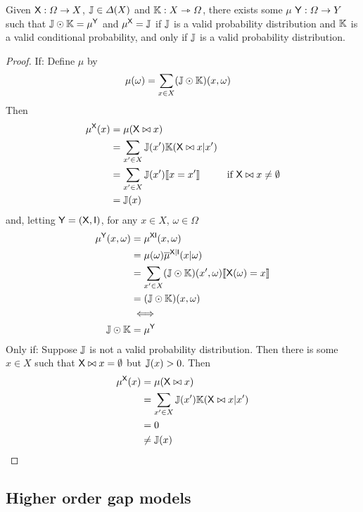 \begin{theorem}[Completion]\label{th:completion}
Given $\mathsf{X}:\Omega\to X$, $\mathbb{J}\in \Delta(X)$ and $\mathbb{K}:X\rightarrowtriangle \Omega$, there exists some $\mu$ $\mathsf{Y}:\Omega\to Y$ such that $\mathbb{J}\odot \mathbb{K}=\mu^{\mathsf{Y}}$ and $\mu^{\mathsf{X}}=\mathbb{J}$ if $\mathbb{J}$ is a valid probability distribution and $\mathbb{K}$ is a valid conditional probability, and only if $\mathbb{J}$ is a valid probability distribution.
\end{theorem}

\begin{proof}
If:
Define $\mu$ by
\begin{align}
	\mu(\omega) &= \sum_{x\in X} (\mathbb{J}\odot \mathbb{K})(x,\omega)
\end{align}
Then
\begin{align}
	\mu^{\mathsf{X}}(x) &= \mu (\mathsf{X}\bowtie x)\\
	&= \sum_{x'\in X} \mathbb{J}(x') \mathbb{K}(\mathsf{X}\bowtie x|x')\\
	&= \sum_{x'\in X} \mathbb{J}(x') \llbracket x=x'\rrbracket&\text{if }\mathsf{X}\bowtie x \neq \emptyset\\
	&= \mathbb{J}(x)
\end{align}
and, letting $\mathsf{Y}=(\mathsf{X},\mathsf{I})$, for any $x\in X$, $\omega\in \Omega$
\begin{align}
	\mu^{\mathsf{Y}}(x,\omega) &= \mu^{\mathsf{XI}}(x,\omega)\\
	&= \mu(\omega)\overline{\mu}^{\mathsf{X}|\mathsf{I}}(x|\omega)\\
	&= \sum_{x'\in X} (\mathbb{J}\odot \mathbb{K})(x',\omega) \llbracket \mathsf{X}(\omega) = x \rrbracket\\
	&= (\mathbb{J}\odot \mathbb{K})(x,\omega)\\
	&\iff\\
	\mathbb{J}\odot \mathbb{K}&=\mu^{\mathsf{Y}}
\end{align}
Only if:
Suppose $\mathbb{J}$ is not a valid probability distribution. Then there is some $x\in X$ such that $\mathsf{X}\bowtie x = \emptyset$ but $\mathbb{J}(x)>0$. Then
\begin{align}
	\mu^{\mathsf{X}}(x) &= \mu (\mathsf{X}\bowtie x)\\
	&= \sum_{x'\in X} \mathbb{J}(x') \mathbb{K}(\mathsf{X}\bowtie x|x')\\
	&= 0\\
	&\neq \mathbb{J}(x)
\end{align}
\end{proof}

\subsection{Higher order gap models}\label{sec:validity_of_gapprob}

